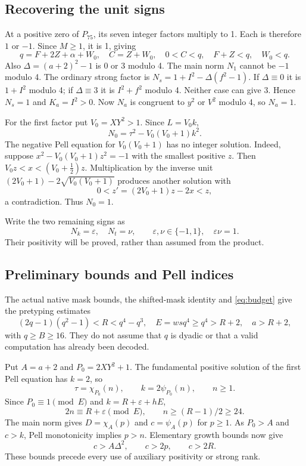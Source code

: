\documentclass[11pt,a4paper]{article}
\theoremstyle{definition}\newtheorem{definition}[theorem]{Definition}
\begin{document}
\subsection{Recovering the unit signs}
At a positive zero of $P_{75}$, its seven integer factors multiply to 1.
Each is therefore $1$ or $-1$. Since $M\ge1$, it is 1, giving
\begin{equation}\label{eq:budget}
 q=F+2Z+\alpha+W_0,\quad C=Z+W_0,\quad
 0<C<q,\quad F+Z<q,\quad W_0<q.
\end{equation}
Also $\Delta=(a+2)^2-1$ is 0 or 3 modulo 4. The main norm $N_1$
cannot be $-1$ modulo 4. The ordinary strong factor is
$N_s=1+I^2-\Delta(f^2-1)$. If $\Delta\equiv0$ it is
$1+I^2$ modulo 4; if $\Delta\equiv3$ it is $I^2+f^2$ modulo 4.
Neither case can give 3. Hence $N_s=1$ and $K_a=I^2>0$.
Now $N_a$ is congruent to $y^2$ or $V^2$ modulo 4, so $N_a=1$.

For the first factor put $V_0=XY^2>1$. Since $L=V_0k$,
\[
 N_0=\tau^2-V_0(V_0+1)k^2.
\]
The negative Pell equation for $V_0(V_0+1)$ has no integer solution.
Indeed, suppose $x^2-V_0(V_0+1)z^2=-1$ with the smallest positive $z$.
Then $V_0z<x<(V_0+\tfrac12)z$. Multiplication by the inverse
unit $(2V_0+1)-2\sqrt{V_0(V_0+1)}$ produces another solution with
\[
 0<z'=(2V_0+1)z-2x<z,
\]
a contradiction. Thus $N_0=1$.

Write the two remaining signs as
\[
 N_k=\varepsilon,\quad N_t=\nu,
 \qquad\varepsilon,\nu\in\{-1,1\},\quad\varepsilon\nu=1.
\]
Their positivity will be proved, rather than assumed from the product.

\subsection{Preliminary bounds and Pell indices}
The actual native mask bounds, the shifted-mask identity and
\eqref{eq:budget} give the pretyping estimates
\begin{equation}\label{eq:bounds}
 (2q-1)(q^2-1)<R<q^4-q^3,\quad
 E=wsq^4\ge q^4>R+2,\quad a>R+2,
\end{equation}
with $q\ge B\ge16$. They do not assume that $q$ is dyadic or that
a valid computation has already been decoded.

Put $A=a+2$ and $P_0=2XY^2+1$. The fundamental positive solution of
the first Pell equation has $k=2$, so
\[
 \tau=\chi_{P_0}(n),\qquad k=2\psi_{P_0}(n),\qquad n\ge1.
\]
Since $P_0\equiv1\pmod E$ and $k=R+\varepsilon+hE$,
\[
 2n\equiv R+\varepsilon\pmod E,\qquad
 n\ge(R-1)/2\ge24.
\]
The main norm gives
$D=\chi_A(p)$ and $c=\psi_A(p)$ for $p\ge1$.
As $P_0>A$ and $c>k$, Pell monotonicity implies $p>n$.
Elementary growth bounds now give
\begin{equation}\label{eq:bootstrap}
 c>A\Delta^2,\qquad c>2p,\qquad c>2R.
\end{equation}
These bounds precede every use of auxiliary positivity or strong rank.
\end{document}
